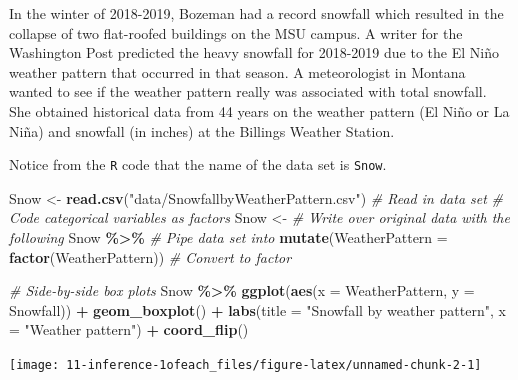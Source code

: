 \documentclass[
]{report}
\newenvironment{Shaded}{\begin{snugshade}}{\end{snugshade}}
\newcommand{\CommentTok}[1]{\textcolor[rgb]{0.56,0.35,0.01}{\textit{#1}}}
\newcommand{\DataTypeTok}[1]{\textcolor[rgb]{0.13,0.29,0.53}{#1}}
\newcommand{\KeywordTok}[1]{\textcolor[rgb]{0.13,0.29,0.53}{\textbf{#1}}}
\newcommand{\NormalTok}[1]{#1}
\newcommand{\OperatorTok}[1]{\textcolor[rgb]{0.81,0.36,0.00}{\textbf{#1}}}
\newcommand{\StringTok}[1]{\textcolor[rgb]{0.31,0.60,0.02}{#1}}
\newcommand\latexcode[1]{#1}
\begin{document}
In the winter of 2018-2019, Bozeman had a record snowfall which resulted in the collapse of two flat-roofed buildings on the MSU campus. A writer for the Washington Post predicted the heavy snowfall for 2018-2019 due to the El Ni\latexcode{\~{n}}o weather pattern that occurred in that season. A meteorologist in Montana wanted to see if the weather pattern really was associated with total snowfall. She obtained historical data from 44 years on the weather pattern (El Ni\latexcode{\~{n}}o or La Ni\latexcode{\~{n}}a) and snowfall (in inches) at the Billings Weather Station.

Notice from the \texttt{R} code that the name of the data set is \texttt{Snow}.

\begin{Shaded}
\begin{Highlighting}[]
\NormalTok{Snow \textless{}{-}}\StringTok{ }\KeywordTok{read.csv}\NormalTok{(}\StringTok{"data/SnowfallbyWeatherPattern.csv"}\NormalTok{) }\CommentTok{\# Read in data set}
\CommentTok{\# Code categorical variables as factors}
\NormalTok{Snow \textless{}{-}}\StringTok{ }\CommentTok{\# Write over original data with the following}
\StringTok{  }\NormalTok{Snow }\OperatorTok{\%\textgreater{}\%}\StringTok{ }\CommentTok{\# Pipe data set into}
\StringTok{  }\KeywordTok{mutate}\NormalTok{(}\DataTypeTok{WeatherPattern =} \KeywordTok{factor}\NormalTok{(WeatherPattern)) }\CommentTok{\# Convert to factor}
\end{Highlighting}
\end{Shaded}

\newpage

\begin{Shaded}
\begin{Highlighting}[]
\CommentTok{\# Side{-}by{-}side box plots}
\NormalTok{Snow }\OperatorTok{\%\textgreater{}\%}
\KeywordTok{ggplot}\NormalTok{(}\KeywordTok{aes}\NormalTok{(}\DataTypeTok{x =}\NormalTok{ WeatherPattern, }\DataTypeTok{y =}\NormalTok{ Snowfall)) }\OperatorTok{+}
\StringTok{    }\KeywordTok{geom\_boxplot}\NormalTok{() }\OperatorTok{+}\StringTok{ }
\StringTok{    }\KeywordTok{labs}\NormalTok{(}\DataTypeTok{title =} \StringTok{"Snowfall by weather pattern"}\NormalTok{,}
         \DataTypeTok{x =} \StringTok{"Weather pattern"}\NormalTok{) }\OperatorTok{+}
\StringTok{    }\KeywordTok{coord\_flip}\NormalTok{()}
\end{Highlighting}
\end{Shaded}

\begin{center}\texttt{[image: 11-inference-1ofeach\_files/figure-latex/unnamed-chunk-2-1]} \end{center}
\end{document}
